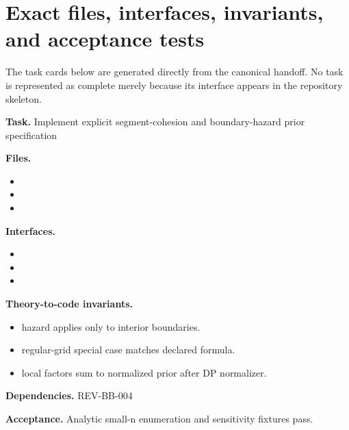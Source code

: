 \section{Exact files, interfaces, invariants, and acceptance tests}
The task cards below are generated directly from the canonical handoff. No task is represented as complete merely because its interface appears in the repository skeleton.

\begin{statusbox}[CODE-BB-001]
\textbf{Task.} Implement explicit segment-cohesion and boundary-hazard prior specification\par
\textbf{Files.}
\begin{itemize}[leftmargin=1.7em,itemsep=1.5pt,topsep=2pt]
\item {}
\item {}
\item {}
\end{itemize}
\textbf{Interfaces.}
\begin{itemize}[leftmargin=1.7em,itemsep=1.5pt,topsep=2pt]
\item {}
\item {}
\item {}
\end{itemize}
\textbf{Theory-to-code invariants.}
\begin{itemize}[leftmargin=1.7em,itemsep=1.5pt,topsep=2pt]
\item hazard applies only to interior boundaries.
\item regular-grid special case matches declared formula.
\item local factors sum to normalized prior after DP normalizer.
\end{itemize}
\textbf{Dependencies.} REV-BB-004\par
\textbf{Acceptance.} Analytic small-n enumeration and sensitivity fixtures pass.
\end{statusbox}

